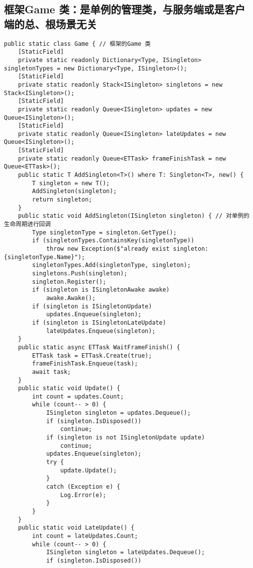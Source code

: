 \documentclass[9pt, b5paper]{article}
\begin{document}
\subsection{框架Game 类：是单例的管理类，与服务端或是客户端的总、根场景无关}
\label{sec-8-2}
\begin{verbatim}
public static class Game { // 框架的Game 类
    [StaticField]
    private static readonly Dictionary<Type, ISingleton> singletonTypes = new Dictionary<Type, ISingleton>();
    [StaticField]
    private static readonly Stack<ISingleton> singletons = new Stack<ISingleton>();
    [StaticField]
    private static readonly Queue<ISingleton> updates = new Queue<ISingleton>();
    [StaticField]
    private static readonly Queue<ISingleton> lateUpdates = new Queue<ISingleton>();
    [StaticField]
    private static readonly Queue<ETTask> frameFinishTask = new Queue<ETTask>();
    public static T AddSingleton<T>() where T: Singleton<T>, new() {
        T singleton = new T();
        AddSingleton(singleton);
        return singleton;
    }
    public static void AddSingleton(ISingleton singleton) { // 对单例的生命周期进行回调
        Type singletonType = singleton.GetType();
        if (singletonTypes.ContainsKey(singletonType)) 
            throw new Exception($"already exist singleton: {singletonType.Name}");
        singletonTypes.Add(singletonType, singleton);
        singletons.Push(singleton);
        singleton.Register();
        if (singleton is ISingletonAwake awake) 
            awake.Awake();
        if (singleton is ISingletonUpdate) 
            updates.Enqueue(singleton);
        if (singleton is ISingletonLateUpdate) 
            lateUpdates.Enqueue(singleton);
    }
    public static async ETTask WaitFrameFinish() {
        ETTask task = ETTask.Create(true);
        frameFinishTask.Enqueue(task);
        await task;
    }
    public static void Update() {
        int count = updates.Count;
        while (count-- > 0) {
            ISingleton singleton = updates.Dequeue();
            if (singleton.IsDisposed()) 
                continue;
            if (singleton is not ISingletonUpdate update) 
                continue;
            updates.Enqueue(singleton);
            try {
                update.Update();
            }
            catch (Exception e) {
                Log.Error(e);
            }
        }
    }
    public static void LateUpdate() {
        int count = lateUpdates.Count;
        while (count-- > 0) {
            ISingleton singleton = lateUpdates.Dequeue();
            if (singleton.IsDisposed()) 

\end{verbatim}
\end{document}
